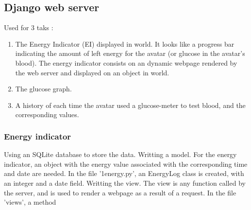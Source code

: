 \subsection{Django web server}
Used for 3 taks : 
\begin{enumerate}
\item The Energy Indicator (EI) displayed in world. It looks like a progress bar indicating the amount of left energy for the avatar (or glucose in the avatar's blood). The energy indicator consists on an dynamic webpage rendered by the web server and displayed on an object in world. 
\item The glucose graph.
\item A history of each time the avatar used a glucose-meter to test blood, and the corresponding  values.
\end{enumerate}

\subsubsection{Energy indicator}
Using an SQLite database to store the data.
Writting a model. For the energy indicator, an object with the energy value associated with the corresponding time and date are needed. In the file '1energy.py', an EnergyLog class is created, with an integer and a date field.
Writting the view. The view is any function called by the server, and is used to render a webpage as a result of a request. In the file 'views', a method 